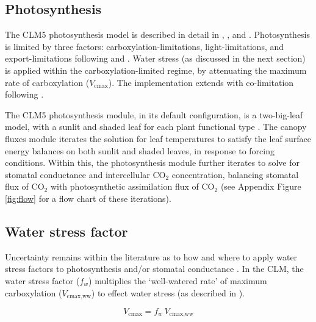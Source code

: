 \documentclass[draft,linenumbers]{agujournal}
\begin{document}
\subsection{Photosynthesis}
\label{sect:A}
    The CLM5 photosynthesis model is described in detail in \citet{bonan2011}, \citet{thornton2007},
    and \citet{oleson2013}. Photosynthesis is limited by three factors: carboxylation-limitations, light-limitations, and export-limitations 
    following \citet{farquhar1980} and \citet{harley1992}. Water stress (as discussed in the next section) is applied within the carboxylation-limited regime, by attenuating the maximum rate of carboxylation ($V_{\text{cmax}}$). The implementation extends \citet{sellers1996a,sellers1996b} with 
    co-limitation following \citet{collatz1991}. 
    
    The CLM5 photosynthesis module, in its default configuration, is a two-big-leaf model, with a sunlit and shaded leaf for each plant functional type \citep{thornton2007, dai2004, oleson2013}. 
    The canopy fluxes module iterates the solution for leaf temperatures to satisfy the leaf surface energy balances on both sunlit and shaded leaves, in response to forcing conditions.
    Within this, the photosynthesis module further iterates to solve for stomatal conductance and intercellular CO$_2$ concentration, balancing stomatal flux of CO$_2$ with photosynthetic assimilation flux of CO$_2$ (see Appendix Figure \ref{fig:flow} for a flow chart of these iterations).


\subsection{Water stress factor}
\label{sect:wsf}
     Uncertainty remains within the literature as to how and where to apply water stress factors to photosynthesis and/or stomatal conductance 
    \citep{zhou2013,novick2016a,sperry2015}.
    In the CLM, the water stress factor ($f_w$) multiplies the `well-watered rate' of maximum carboxylation ($V_{\text{cmax,ww}}$) to effect water stress (as described in \citet{oleson2013}). 
    
    \begin{equation}
    V_{\text{cmax}} = f_w\, V_{\text{cmax,ww}} 
    \end{equation}
\end{document}
